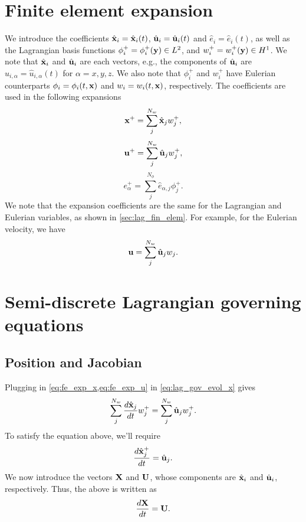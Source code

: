 \documentclass[11pt]{report}
\begin{document}
\section{Finite element expansion}
We introduce the coefficients $\hat{\mathbf{x}}_i = \hat{\mathbf{x}}_i(t)$, $\hat{\mathbf{u}}_i = \hat{\mathbf{u}}_i(t)$ and $\hat{e}_i = \hat{e}_i(t)$, as well as the Lagrangian basis functions $\phi^+_i = \phi^+_i(\mathbf{y}) \in L^2$, and $w^+_i = w^+_i(\mathbf{y}) \in H^1$. We note that $\hat{\mathbf{x}}_i$ and $\hat{\mathbf{u}}_i$ are each vectors, e.g., the components of $\hat{\mathbf{u}}_i$ are $\hat{u}_{i,\alpha} = \hat{u}_{i,\alpha}(t)$ for $\alpha = x,y,z$. We also note that $\phi^+_i$ and $w^+_i$ have Eulerian counterparts $\phi_i = \phi_i(t,\mathbf{x})$ and $w_i = w_i(t,\mathbf{x})$, respectively. The coefficients are used in the following expansions
\begin{equation}
    \label{eq:fe_exp_x}
    \mathbf{x}^+ = \sum_j^{N_w} \hat{\mathbf{x}}_j w^+_j,
\end{equation}
\begin{equation}
    \label{eq:fe_exp_u}
    \mathbf{u}^+ = \sum_j^{N_w} \hat{\mathbf{u}}_j w^+_j,
\end{equation}
\begin{equation}
    \label{eq:fe_exp_e}
    e^+_\alpha = \sum_j^{N_\phi} \hat{e}_{\alpha,j} \phi^+_j.
\end{equation}
We note that the expansion coefficients are the same for the Lagrangian and Eulerian variables, as shown in \cref{sec:lag_fin_elem}. For example, for the Eulerian velocity, we have
\begin{equation}
    \mathbf{u} = \sum_j^{N_w} \hat{\mathbf{u}}_j w_j.
\end{equation}

\section{Semi-discrete Lagrangian governing equations}
\subsection{Position and Jacobian}
Plugging in \cref{eq:fe_exp_x,eq:fe_exp_u} in \cref{eq:lag_gov_evol_x} gives
\begin{equation*}
    \sum_{j}^{N_w} \frac{d \hat{\mathbf{x}}_j}{dt} w^+_j = \sum_{j}^{N_w} \hat{\mathbf{u}}_j w^+_j.
\end{equation*}
To satisfy the equation above, we'll require
\begin{equation*}
    \frac{d \hat{\mathbf{x}}^+_j}{dt} = \hat{\mathbf{u}}_j.
\end{equation*}
We now introduce the vectors $\mathbf{X}$ and $\mathbf{U}$, whose components are $\hat{\mathbf{x}}_i$ and $\hat{\mathbf{u}}_i$, respectively. Thus, the above is written as
\begin{equation}
    \label{eq:evol_x_semi_discrete}
    \frac{d\mathbf{X}}{dt} = \mathbf{U}.
\end{equation}
\end{document}
